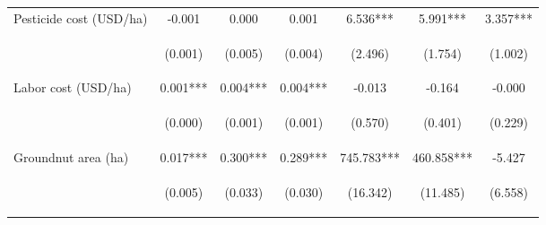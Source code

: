 \begin{center}
\begin{tabular}{lcccccc}
Pesticide cost (USD/ha) & -0.001 & 0.000 & 0.001 & 6.536*** & 5.991*** & 3.357*** \\
\vspace{4pt} & \begin{footnotesize}(0.001)\end{footnotesize} & \begin{footnotesize}(0.005)\end{footnotesize} & \begin{footnotesize}(0.004)\end{footnotesize} & \begin{footnotesize}(2.496)\end{footnotesize} & \begin{footnotesize}(1.754)\end{footnotesize} & \begin{footnotesize}(1.002)\end{footnotesize} \\
Labor cost (USD/ha) & 0.001*** & 0.004*** & 0.004*** & -0.013 & -0.164 & -0.000 \\
\vspace{4pt} & \begin{footnotesize}(0.000)\end{footnotesize} & \begin{footnotesize}(0.001)\end{footnotesize} & \begin{footnotesize}(0.001)\end{footnotesize} & \begin{footnotesize}(0.570)\end{footnotesize} & \begin{footnotesize}(0.401)\end{footnotesize} & \begin{footnotesize}(0.229)\end{footnotesize} \\
Groundnut area (ha) & 0.017*** & 0.300*** & 0.289*** & 745.783*** & 460.858*** & -5.427 \\
\vspace{4pt} & \begin{footnotesize}(0.005)\end{footnotesize} & \begin{footnotesize}(0.033)\end{footnotesize} & \begin{footnotesize}(0.030)\end{footnotesize} & \begin{footnotesize}(16.342)\end{footnotesize} & \begin{footnotesize}(11.485)\end{footnotesize} & \begin{footnotesize}(6.558)\end{footnotesize} \\

\end{tabular}
\end{center}
